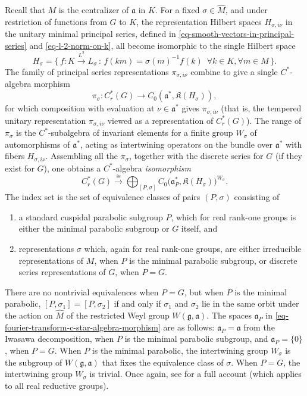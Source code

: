 \documentclass[leqno,11pt]{amsart}
\numberwithin{equation}{subsection}
\theoremstyle{plain}
\theoremstyle{definition}
\theoremstyle{remark}
\begin{document}
Recall that $M$ is the centralizer of $\mathfrak{a}$ in $K$. For a fixed $\sigma\in \widehat M$, and under restriction of functions from $G$ to $K$,   the representation Hilbert spaces $H_{\sigma, i \nu}$ in the unitary minimal principal series, defined in \eqref{eq-smooth-vectors-in-principal-series} and \eqref{eq-l-2-norm-on-k},  all become isomorphic to the single Hilbert space 
\[
H_\sigma = \bigl \{ \, f \colon  K \stackrel{L^2}\to L_\sigma \,:\, f(km)= \sigma(m)^{-1} f(k)\,\,\,
\forall k\in K, \forall m\in M \, \bigr \}  .
\]
The family of principal series representations $\pi_{\sigma, i\nu}$ combine to give a single $C^*$-algebra morphism 
\[
\pi_\sigma \colon C^*_r (G)\longrightarrow C_0(\mathfrak{a}^*, \mathfrak{K} (H_\sigma)  ),
\]
for which composition with evaluation at $\nu\in \mathfrak{a}^*$ gives $\pi_{\sigma, i \nu}$ (that is, the tempered unitary representation $\pi_{\sigma, i\nu}$ viewed as a representation of $C^*_r(G)$). The range of $\pi_\sigma$ is the $C^*$-subalgebra of invariant elements for a finite group $W_\sigma$ of automorphisms of $\mathfrak{a}^*$, acting as intertwining operators on the bundle over $\mathfrak{a}^*$ with fibers $H_{\sigma,i\nu}$.  Assembling all the $\pi_\sigma$, together with the discrete series for $G$ (if they exist for $G$), one obtains a $C^*$-algebra \emph{isomorphism} 
\begin{equation}
\label{eq-fourier-transform-c-star-algebra-morphism}
C^*_r(G)  \stackrel \cong \longrightarrow \bigoplus _{[P,\sigma]}
C_0\bigl  (\mathfrak{a}^*_P, \mathfrak{K}(H_\sigma  )\bigr ) ^{W_\sigma}.
\end{equation}
The index set is the set of equivalence classes of pairs $(P,\sigma)$ consisting of 
\begin{enumerate}[\rm (i)]

\item a standard cuspidal parabolic subgroup $P$, which for real rank-one groups is either  the minimal parabolic subgroup or $G$ itself, and 

\item representations $\sigma$ which, again for real rank-one groups, are either irreducible representations of $M$, when $P$ is the minimal parabolic subgroup, or discrete series representations of $G$, when $P{=}G$.  
\end{enumerate}
There are no nontrivial  equivalences    when $P{=}G$, but when $P$ is the minimal parabolic, $[P,\sigma_1] = [P,\sigma_2]$ if and only if $\sigma_1$ and $\sigma_2$ lie in the same orbit under the action on $\widehat M$ of the restricted Weyl group $W(\mathfrak{g},
\mathfrak{a})$. The spaces $\mathfrak{a}_P$ in \eqref{eq-fourier-transform-c-star-algebra-morphism} are as follows:  $\mathfrak{a}_P {=}\mathfrak{a}$ from the Iwasawa decomposition, when $P$ is the minimal parabolic subgroup, and $\mathfrak{a}_P{=}\{ 0\}$, when $P{=}G$.  When $P$ is the minimal parabolic, the intertwining group $W_\sigma$ is the subgroup of $W(\mathfrak{g},
\mathfrak{a})$ that fixes the equivalence class of $\sigma$. 
When $P{=}G$, the intertwining group  $W_\sigma$ is trivial.  Once again, see \cite{ClareCrispHigson16} for a full account (which   applies to all real reductive groups).
\end{document}
